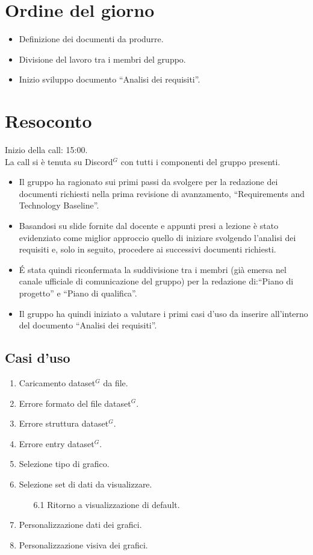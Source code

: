 \section{Ordine del giorno}

\begin{itemize}
	\item Definizione dei documenti da produrre.
	\item Divisione del lavoro tra i membri del gruppo.
	\item Inizio sviluppo documento ``Analisi dei requisiti''.
\end{itemize}

\section{Resoconto}

\noindent 
Inizio della call: 15:00. \\
\noindent La call si è tenuta su Discord$^{G}$ con tutti i componenti del gruppo presenti.
\begin{itemize}
	\item Il gruppo ha ragionato sui primi passi da svolgere per la redazione dei documenti richiesti nella prima revisione di avanzamento, ``Requirements and Technology Baseline''.
	\item Basandosi su slide fornite dal docente e appunti presi a lezione è stato evidenziato come miglior approccio quello di iniziare svolgendo l'analisi dei requisiti e, solo in seguito, procedere ai successivi documenti richiesti.
	\item \' E stata quindi riconfermata la suddivisione tra i membri (già emersa nel canale ufficiale di comunicazione del gruppo) per la redazione di:``Piano di progetto'' e ``Piano di qualifica''.
	\item Il gruppo ha quindi iniziato a valutare i primi casi d'uso da inserire all'interno del documento ``Analisi dei requisiti''.
\end{itemize}

\subsection{Casi d'uso}
\begin{enumerate}
	\item Caricamento dataset$^{G}$ da file.
	\item Errore formato del file dataset$^{G}$.
	\item Errore struttura dataset$^{G}$.
	\item Errore entry dataset$^{G}$.
	\item Selezione tipo di grafico.
	\item Selezione set di dati da visualizzare.
	\begin{enumerate}
		\item[6.1] Ritorno a visualizzazione di default.
	\end{enumerate}
	\item Personalizzazione dati dei grafici.
	\item Personalizzazione visiva dei grafici.
\end{enumerate} 

